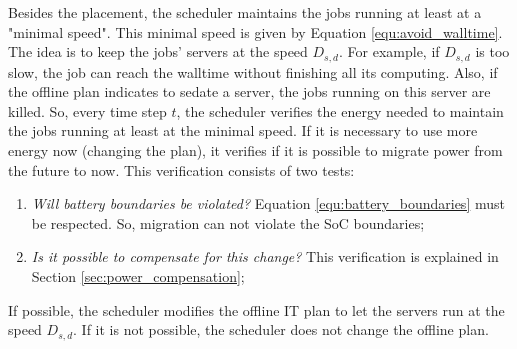 Besides the placement, the scheduler maintains the jobs running at least at a "minimal speed". This minimal speed is given by Equation \ref{equ:avoid_walltime}. The idea is to keep the jobs' servers at the speed $D_{s,d}$. For example, if $D_{s,d}$ is too slow, the job can reach the walltime without finishing all its computing. Also, if the offline plan indicates to sedate a server, the jobs running on this server are killed. So, every time step $t$, the scheduler verifies the energy needed to maintain the jobs running at least at the minimal speed. If it is necessary to use more energy now (changing the plan), it verifies if it is possible to migrate power from the future to now. This verification consists of two tests:
\begin{enumerate}
    \item \textit{Will battery boundaries be violated?} Equation \ref{equ:battery_boundaries} must be respected. So, migration can not violate the SoC boundaries;
    \item \textit{Is it possible to compensate for this change?} This verification is explained in Section \ref{sec:power_compensation};
\end{enumerate}

If possible, the scheduler modifies the offline IT plan to let the servers run at the speed $D_{s,d}$. If it is not possible, the scheduler does not change the offline plan. 

